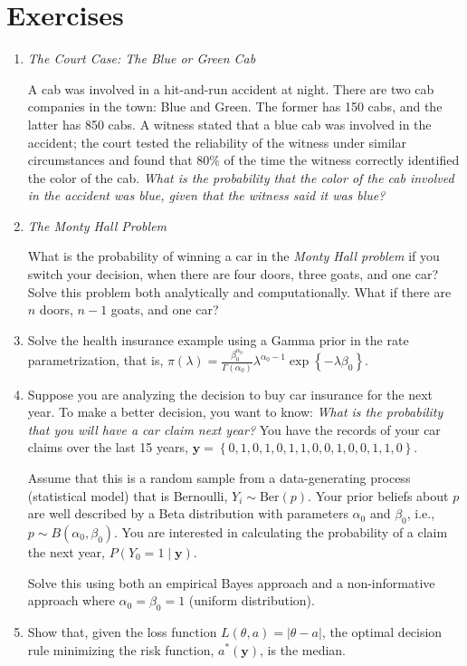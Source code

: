 \section{Exercises}

\begin{enumerate}
	\item \textit{The Court Case: The Blue or Green Cab}
	
	A cab was involved in a hit-and-run accident at night. There are two cab companies in the town: Blue and Green. The former has 150 cabs, and the latter has 850 cabs. A witness stated that a blue cab was involved in the accident; the court tested the reliability of the witness under similar circumstances and found that 80\% of the time the witness correctly identified the color of the cab. \textit{What is the probability that the color of the cab involved in the accident was blue, given that the witness said it was blue?}
	
	\item \textit{The Monty Hall Problem}
	
	What is the probability of winning a car in the \textit{Monty Hall problem} if you switch your decision, when there are four doors, three goats, and one car? Solve this problem both analytically and computationally. What if there are $n$ doors, $n-1$ goats, and one car?
	
	\item Solve the health insurance example using a Gamma prior in the rate parametrization, that is, $\pi(\lambda) = \frac{\beta_0^{\alpha_0}}{\Gamma(\alpha_0)} \lambda^{\alpha_0 - 1} \exp\left\{-\lambda \beta_0\right\}$.
	
	\item Suppose you are analyzing the decision to buy car insurance for the next year. To make a better decision, you want to know: \textit{What is the probability that you will have a car claim next year?} You have the records of your car claims over the last 15 years, $\mathbf{y} = \left\{ 0, 1, 0, 1, 0, 1, 1, 0, 0, 1, 0, 0, 1, 1, 0 \right\}$.
	
	Assume that this is a random sample from a data-generating process (statistical model) that is Bernoulli, $Y_i \sim \text{Ber}(p)$. Your prior beliefs about $p$ are well described by a Beta distribution with parameters $\alpha_0$ and $\beta_0$, i.e., $p \sim B(\alpha_0, \beta_0)$. You are interested in calculating the probability of a claim the next year, $P(Y_0 = 1 \mid \mathbf{y})$.
	
	Solve this using both an empirical Bayes approach and a non-informative approach where $\alpha_0 = \beta_0 = 1$ (uniform distribution).
	
	\item Show that, given the loss function $L(\theta, a) = |\theta - a|$, the optimal decision rule minimizing the risk function, $a^*(\mathbf{y})$, is the median.
	
\end{enumerate}




